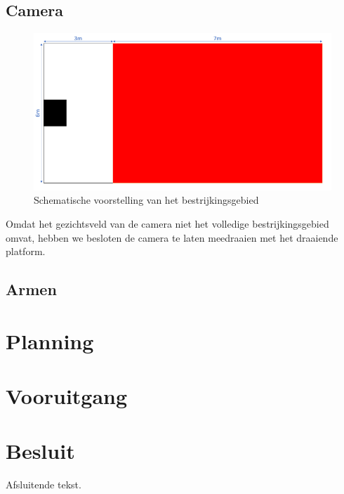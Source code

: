 \documentclass[kulak]{kulakarticle} %
\begin{document}
\subsection{Camera}
\begin{figure} [h!]
	\centering
	\includegraphics[width = .75 \textwidth]{schematische voorstelling bestrijkingsgebied LATEX}
	\caption{Schematische voorstelling van het bestrijkingsgebied}
	\label{bestrijkingsgebied}
\end{figure}
Omdat het gezichtsveld van de camera niet het volledige bestrijkingsgebied omvat, hebben we besloten de camera te laten meedraaien met het draaiende platform. 

\subsection{Armen}



\section{Planning}


\section{Vooruitgang}


\section*{Besluit}

Afsluitende tekst.
\end{document}
